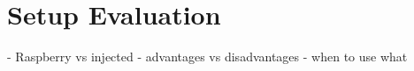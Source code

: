 \section{Setup Evaluation\label{sec:setupevaluation}}

- Raspberry vs injected
- advantages vs disadvantages
- when to use what

%
%
%
%
%
%
%
